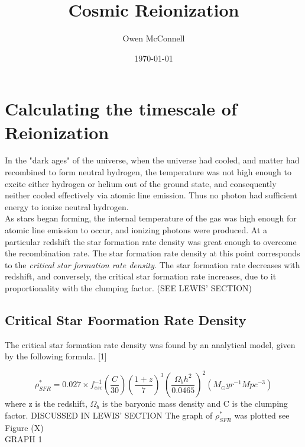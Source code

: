 \documentclass[pdf,color]{UoBnote}
\author{Owen McConnell}
\title{Cosmic Reionization}
\date{\today}
\begin{document}







\section{Calculating the timescale of Reionization}
In the "dark ages" of the universe, when the universe had cooled, and matter had recombined to form neutral hydrogen, the temperature was not high enough to excite either hydrogen or helium out of the ground state, and consequently neither cooled effectively via atomic line emission. Thus no photon had sufficient energy to ionize neutral hydrogen. \\
\newline
As stars began forming, the internal temperature of the gas was high enough for atomic line emission to occur, and ionizing photons were produced. At a particular redshift the star formation rate density was great enough to overcome the recombination rate. The star formation rate density at this point corresponds to the \emph{critical star formation rate density}. The star formation rate decreases with redshift, and conversely, the critical star formation rate increases, due to it proportionality with the clumping factor. (SEE LEWIS' SECTION)












\subsection{Critical Star Foormation Rate Density}
The critical star formation rate density was found by an analytical model, given by the following formula. [1]

\begin{equation}
\rho^*_{SFR} = 0.027 \times f^{-1}_{esc} \left (\frac{C}{30} \right ) \left (\frac{1+z}{7} \right )^3 \left (\frac{\Omega_b h^2}{0.0465} \right )^2 (M_\odot yr^{-1} Mpc^{-3})
\end{equation}
where z is the redshift, $\Omega_b$ is the baryonic mass density and C is the clumping factor. DISCUSSED IN LEWIS' SECTION The graph of $\rho^*_{SFR}$ was plotted see Figure (X)\\
\newline
GRAPH 1
\end{document}
